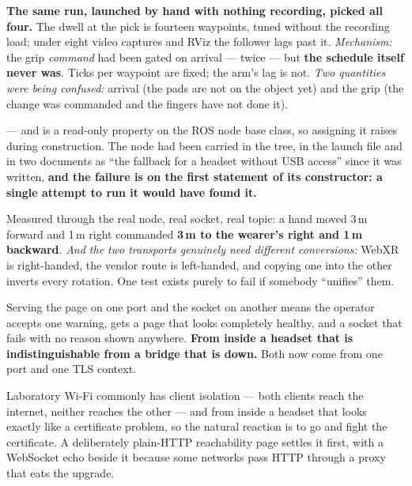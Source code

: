 {\textbf{The same run, launched by hand with nothing recording, picked all
four.} The dwell at the pick is fourteen waypoints, tuned without the recording
load; under eight video captures and RViz the follower lags past it.
\textit{Mechanism:} the grip \emph{command} had been gated on arrival --- twice
--- but \textbf{the schedule itself never was}. Ticks per waypoint are fixed;
the arm's lag is not. \textit{Two quantities were being confused:} arrival (the
pads are not on the object yet) and the grip (the change was commanded and the
fingers have not done it).}


{ --- and  is a read-only property on
the ROS node base class, so assigning it raises during construction. The node had
been carried in the tree, in the launch file and in two documents as ``the
fallback for a headset without USB access'' since it was written, \textbf{and the
failure is on the first statement of its constructor: a single attempt to run it
would have found it.}}

{Measured through the real node, real socket, real topic: a hand moved 3\,m
forward and 1\,m right commanded \textbf{3\,m to the wearer's right and 1\,m
backward}. \textit{And the two transports genuinely need different conversions:}
WebXR is right-handed, the vendor route is left-handed, and copying one into the
other inverts every rotation. One test exists purely to fail if somebody
``unifies'' them.}

{Serving the page on one port and the socket on another means the operator
accepts one warning, gets a page that looks completely healthy, and a socket
that fails with no reason shown anywhere. \textbf{From inside a headset that is
indistinguishable from a bridge that is down.} Both now come from one port and
one TLS context.}

{Laboratory Wi-Fi commonly has client isolation --- both clients reach the
internet, neither reaches the other --- and from inside a headset that looks
exactly like a certificate problem, so the natural reaction is to go and fight
the certificate. A deliberately plain-HTTP reachability page settles it first,
with a WebSocket echo beside it because some networks pass HTTP through a proxy
that eats the upgrade.}

